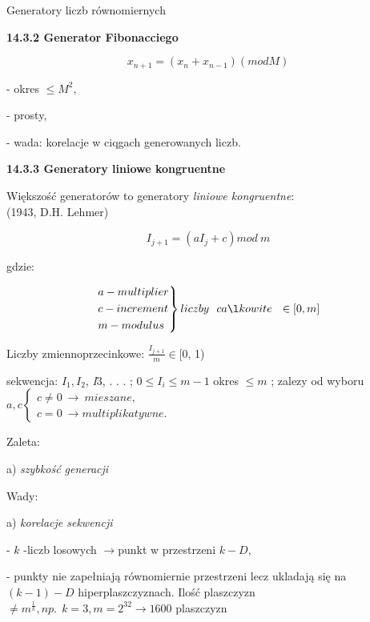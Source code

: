     \begin{frame}{Generatory liczb równomiernych}
  	
	\textbf{14.3.2 Generator Fibonacciego}
	\begin{center}
 	$$x_{n+1} = (x_{n} + x_{n-1})(mod M)$$
	\end{center}
	- okres $\leq M^{2},$

	- prosty,

	- wada: korelacje w ciqgach generowanych liczb.
    \newline
	\end{frame}
    \begin{frame}
	\textbf{14.3.3 Generatory liniowe kongruentne}
    
	Większość generatorów to generatory {\it liniowe kongruentne}:\\ (1943, D.H. Lehmer)
	\begin{center}
 	$$I_{j+1} = (aI_{j}+c) mod\ m$$ 
	\end{center}
	gdzie:

    \[
    {\begin{rcases*}
	a - multiplier\\
	c - increment\\
	m - modulus
    \end{rcases*} liczby\ \ całkowite \ \ \in [0,m]}
    \]
	\end{frame}
    \begin{frame}
	Liczby zmiennoprzecinkowe: $\displaystyle \frac{I_{j+1}}{m}\in[0$, 1)
    \newline
    
	sekwencja: $I_{1}, I_{2}$, {\it I}3, . . . ; $0\leq I_{i}\leq m-1$ 
    \newline \newline
    okres $\leq m$ ; zalezy od wyboru $a, c \left\{\begin{array}{l}
	c\neq 0\ \rightarrow\ mieszane,\\
	c=0\ \rightarrow multiplikatywne.
	\end{array}\right.$

	Zaleta:

	a) {\it szybkość generacji}
	\newline
    
	Wady:

	a) {\it korelacje sekwencji}

	- $k$ -liczb losowych $\rightarrow$punkt w przestrzeni $k-D,$

	- punkty nie zapełniają r\'{o}wnomiernie przestrzeni lecz ukladają się na $(k-1)-D$ 				hiperplaszczyznach. Ilość plaszczyzn $\neq m^{\frac{1}{k}}, np. \ \ k=3, m=2^{32}\rightarrow 1600$ 		plaszczyzn
	
    \end{frame}
